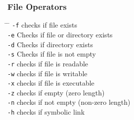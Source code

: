 \documentclass[a4paper,10pt]{article}
\begin{document}
\subsubsection*{File Operators}
\begin{tabbing}
	\= \hspace{30mm} \= \hspace{50mm} \kill
	\> \verb|-f| \> checks if file exists \\
	\> \verb|-e| \> Checks if file or directory exists \\
	\> \verb|-d| \> Checks if directory exists \\
	\> \verb|-s| \> Checks if file is not empty \\
	\> \verb|-r| \> checks if file is readable \\
	\> \verb|-w| \> checks if file is writable \\
	\> \verb|-x| \> checks if file is executable \\
	\> \verb|-z| \> checks if empty (zero length) \\
	\> \verb|-n| \> checks if not empty (non-zero length) \\
	\> \verb|-h| \> checks if symbolic link \\
\end{tabbing}
\end{document}
